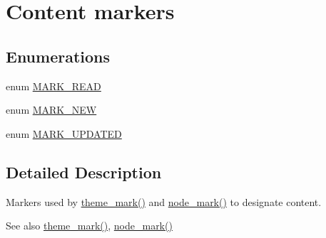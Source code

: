 \hypertarget{group__content__flags}{
\section{Content markers}
\label{group__content__flags}
}
\subsection*{Enumerations}
\begin{DoxyCompactItemize}
\item 
enum \hyperlink{group__content__flags_ga72684c074c0ade1909bad72841c48614}{MARK\_\-READ} 
\item 
enum \hyperlink{group__content__flags_ga44d42cbfa50b553ad2439e19478d0d3d}{MARK\_\-NEW} 
\item 
enum \hyperlink{group__content__flags_ga6e9f0d9282433b9f08f025aaca43e1fe}{MARK\_\-UPDATED} 
\end{DoxyCompactItemize}


\subsection{Detailed Description}
Markers used by \hyperlink{group__themeable_ga10b9e641d13efcf0ed3e55fd03bc4f54}{theme\_\-mark()} and \hyperlink{node_8module_a33745a626aae6ed3852904a34d587c57}{node\_\-mark()} to designate content. \begin{DoxySeeAlso}{See also}
\hyperlink{group__themeable_ga10b9e641d13efcf0ed3e55fd03bc4f54}{theme\_\-mark()}, \hyperlink{node_8module_a33745a626aae6ed3852904a34d587c57}{node\_\-mark()} 
\end{DoxySeeAlso}


